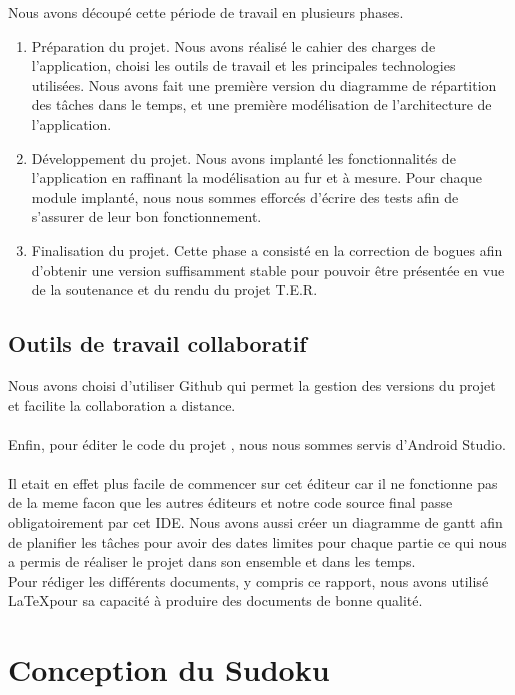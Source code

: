 \documentclass{article}
\begin{document}
Nous avons découpé cette période de travail en plusieurs phases.
\begin{enumerate}
    \item Préparation du projet. Nous avons réalisé le cahier des charges de l’application, choisi les
          outils de travail et les principales technologies utilisées. Nous avons fait une première version
          du diagramme de répartition des tâches dans le temps, et une première modélisation de
          l’architecture de l’application.
\item Développement du projet. Nous avons implanté les fonctionnalités de l’application en
raffinant la modélisation au fur et à mesure. Pour chaque module implanté, nous nous sommes
efforcés d’écrire des tests afin de s’assurer de leur bon fonctionnement.
\item Finalisation du projet. Cette phase a consisté en la correction de bogues afin d’obtenir une
version suffisamment stable pour pouvoir être présentée en vue de la soutenance et du rendu
du projet T.E.R.
\end{enumerate}
\newpage

\subsection{Outils de travail collaboratif }
Nous avons choisi d’utiliser Github qui  permet la gestion des versions du projet et facilite la collaboration a distance.\\\\
Enfin, pour éditer le code du projet , nous nous sommes servis d'Android Studio.\\\\
Il etait en effet plus facile de commencer sur cet éditeur car il ne fonctionne pas de la meme facon que les autres éditeurs et notre code source final passe obligatoirement par cet IDE.
Nous avons aussi créer un diagramme de gantt afin de planifier les tâches pour avoir des dates limites pour chaque partie ce qui nous a permis de réaliser le projet dans son ensemble et dans les temps.\\
\newline Pour rédiger les différents documents, y compris ce rapport, nous
avons utilisé \LaTeX  pour sa capacité à produire des documents de bonne qualité.


\section{Conception du Sudoku}
\end{document}

